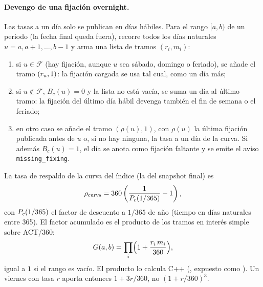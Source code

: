 \paragraph{Devengo de una fijación overnight.} Las tasas a un día solo se publican en días hábiles. Para el rango $[a, b)$ de un periodo (la fecha final queda fuera),  recorre todos los días naturales $u = a, a+1, \dots, b-1$ y arma una lista de tramos $(r_i, m_i)$:
\begin{enumerate}
  \item si $u \in \mathcal{F}$ (hay fijación, aunque $u$ sea sábado, domingo o feriado), se añade el tramo $(r_{u}, 1)$: la fijación cargada se usa tal cual, como un día más;
  \item si $u \notin \mathcal{F}$, $B_c(u) = 0$ y la lista no está vacía, se suma un día al último tramo: la fijación del último día hábil devenga también el fin de semana o el feriado;
  \item en otro caso se añade el tramo $(\rho(u), 1)$, con $\rho(u)$ la última fijación publicada antes de $u$ o, si no hay ninguna, la tasa a un día de la curva. Si además $B_c(u) = 1$, el día se anota como fijación faltante y se emite el aviso \texttt{missing\_fixing}.
\end{enumerate}
La tasa de respaldo de la curva del índice (la del snapshot final) es
\begin{equation}\label{eq:cap08-respaldo}
  \rho_{\mathrm{curva}} = 360\left(\frac{1}{P_{c}(1/365)} - 1\right),
\end{equation}
con $P_{c}(1/365)$ el factor de descuento a $1/365$ de año (tiempo en días naturales entre 365). El factor acumulado es el producto de los tramos en interés simple sobre ACT/360:
\begin{equation}\label{eq:cap08-factor}
  G(a, b) = \prod_{i}\Bigl(1 + \frac{r_i\,m_i}{360}\Bigr),
\end{equation}
igual a $1$ si el rango es vacío. El producto lo calcula C++ (, expuesto como ). Un viernes con tasa $r$ aporta entonces $1 + 3r/360$, no $(1 + r/360)^3$.

